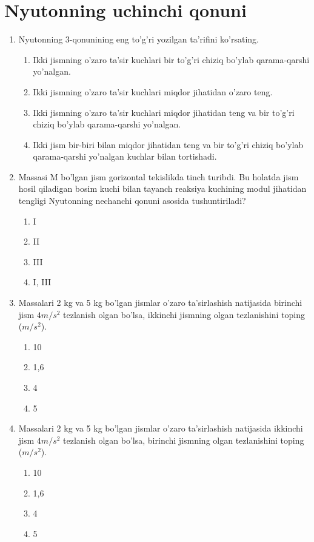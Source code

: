 \section{Nyutonning uchinchi qonuni}


\begin{enumerate}

\item Nyutonning 3-qonunining eng to'g'ri yozilgan ta'rifini ko'rsating.
\begin{enumerate}[label=\Alph*)]
\item Ikki jismning o'zaro ta'sir kuchlari bir to'g'ri chiziq bo'ylab qarama-qarshi yo'nalgan.
\item Ikki jismning o'zaro ta'sir kuchlari miqdor jihatidan o'zaro teng.
\item Ikki jismning o'zaro ta'sir kuchlari miqdor jihatidan teng va bir to'g'ri chiziq bo'ylab qarama-qarshi yo'nalgan.
\item Ikki jism bir-biri bilan miqdor jihatidan teng va bir to'g'ri chiziq bo'ylab qarama-qarshi yo'nalgan kuchlar bilan tortishadi.
\end{enumerate}

\item Massasi M bo'lgan jism gorizontal tekislikda tinch turibdi. Bu holatda jism hosil qiladigan bosim kuchi bilan tayanch reaksiya kuchining modul jihatidan tengligi Nyutonning nechanchi qonuni asosida tushuntiriladi?
\begin{enumerate}[label=\Alph*)]
\item I
\item II
\item III
\item I, III
\end{enumerate}

\item Massalari 2 kg va 5 kg bo'lgan jismlar o'zaro ta'sirlashish natijasida birinchi jism $4 m/s^2$ tezlanish olgan bo'lsa, ikkinchi jismning olgan tezlanishini toping ($m/s^2$).
\begin{enumerate}[label=\Alph*)]
\item 10
\item 1,6
\item 4
\item 5
\end{enumerate}

\item Massalari 2 kg va 5 kg bo'lgan jismlar o'zaro ta'sirlashish natijasida ikkinchi jism $4 m/s^2$ tezlanish olgan bo'lsa, birinchi jismning olgan tezlanishini toping ($m/s^2$).
\begin{enumerate}[label=\Alph*)]
\item 10
\item 1,6
\item 4
\item 5
\end{enumerate}


\end{enumerate}
